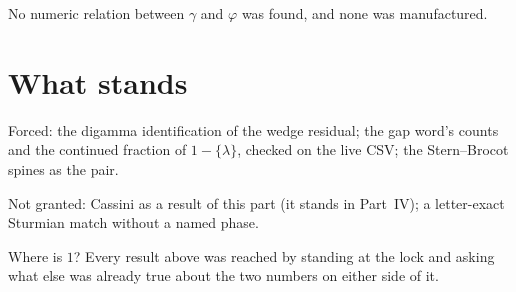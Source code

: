 \documentclass[10pt,a4paper]{article}
\theoremstyle{plain}
\theoremstyle{definition}
\theoremstyle{remark}
\begin{document}
No numeric relation between \(\gamma\) and \(\varphi\) was found, and none was manufactured.

\section{What stands}

Forced:
the digamma identification of the wedge residual;
the gap word's counts and the continued fraction of \(1-\{\lambda\}\), checked on the live CSV;
the Stern--Brocot spines as the pair.

Not granted:
Cassini as a result of this part (it stands in Part~IV);
a letter-exact Sturmian match without a named phase.

Where is \(1\)?
Every result above was reached by standing at the lock and asking what else was already true about the two numbers on either side of it.
\end{document}
